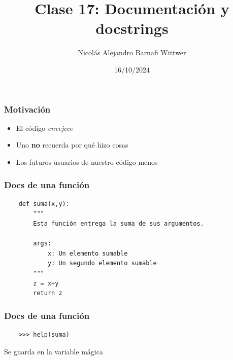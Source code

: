 \documentclass[14pt,aspectratio=169,xcolor=dvipsnames]{beamer}
\title[short title]{Clase 17: Documentación y docstrings}
\subtitle{}
\author[NA Barnafi] {Nicolás Alejandro Barnafi Wittwer}
\institute[UC|CMM] 
{
    Pontificia Universidad Católica de Chile \\
    Centro de Modelamiento Matemático
}
\date{16/10/2024}
\begin{document}
\begin{frame}
    \maketitle
\end{frame}
\begin{frame}\frametitle{Motivación}
    \begin{itemize}
        \item El código \emph{envejece}
        \item Uno \textbf{no} recuerda por qué hizo cosas
        \item Los futuros usuarios de nuestro código \huge{menos}
    \end{itemize}
\end{frame}
\begin{frame}[fragile]\frametitle{Docs de una función}
    \begin{verbatim}
    def suma(x,y):
        """
        Esta función entrega la suma de sus argumentos. 
            
        args: 
            x: Un elemento sumable
            y: Un segundo elemento sumable
        """
        z = x+y
        return z
    \end{verbatim}
\end{frame}
\begin{frame}[fragile]\frametitle{Docs de una función}
    \begin{verbatim}
    >>> help(suma)
    \end{verbatim}

    \vspace{1cm}
    Se guarda en la variable mágica 

\end{frame}
\end{document}
